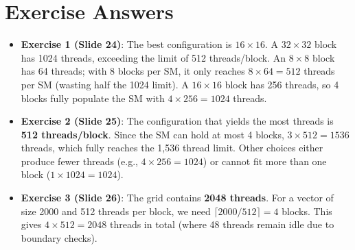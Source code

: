 \documentclass{report}
\begin{document}
\section{Exercise Answers}
\begin{itemize}
    \item \textbf{Exercise 1 (Slide 24)}: The best configuration is \textbf{$16 \times 16$}. A $32 \times 32$ block has 1024 threads, exceeding the limit of 512 threads/block. An $8 \times 8$ block has 64 threads; with 8 blocks per SM, it only reaches $8 \times 64 = 512$ threads per SM (wasting half the 1024 limit). A $16 \times 16$ block has 256 threads, so 4 blocks fully populate the SM with $4 \times 256 = 1024$ threads.
    \item \textbf{Exercise 2 (Slide 25)}: The configuration that yields the most threads is \textbf{512 threads/block}. Since the SM can hold at most 4 blocks, $3 \times 512 = 1536$ threads, which fully reaches the 1,536 thread limit. Other choices either produce fewer threads (e.g., $4 \times 256 = 1024$) or cannot fit more than one block ($1 \times 1024 = 1024$).
    \item \textbf{Exercise 3 (Slide 26)}: The grid contains \textbf{2048 threads}. For a vector of size 2000 and 512 threads per block, we need $\lceil 2000 / 512 \rceil = 4$ blocks. This gives $4 \times 512 = 2048$ threads in total (where 48 threads remain idle due to boundary checks).
\end{itemize}
\end{document}
